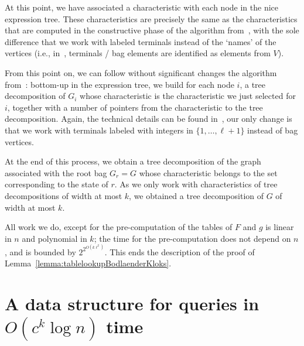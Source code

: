 \documentclass[a4paper,11pt]{article}
\theoremstyle{definition}
\theoremstyle{remark}
\begin{document}
At this point, we have associated a characteristic with each node in
the nice expression tree.  These characteristics are precisely the
same as the characteristics that are computed in the constructive
phase of the algorithm from~\cite[Section 6]{BodlaenderK96}, with the
sole difference that we work with labeled terminals instead of the
`names' of the vertices (i.e., in~\cite{BodlaenderK96}, terminals /
bag elements are identified as elements from $V$).

From this point on, we can follow without significant changes the
algorithm from~\cite[Section 6]{BodlaenderK96}: bottom-up in the
expression tree, we build for each node $i$, a tree decomposition of
$G_i$ whose characteristic is the characteristic we just selected for
$i$, together with a number of pointers from the characteristic to the
tree decomposition.  Again, the technical details can be found
in~\cite{BodlaenderK96}, our only change is that we work with
terminals labeled with integers in $\{1, \ldots, \ell+1\}$ instead of
bag vertices.

At the end of this process, we obtain a tree decomposition of the
graph associated with the root bag $G_r = G$ whose characteristic
belongs to the set corresponding to the state of $r$.  As we only work
with characteristics of tree decompositions of width at most $k$, we
obtained a tree decomposition of $G$ of width at most $k$.

All work we do, except for the pre-computation of the tables of $F$
and $g$ is linear in $n$ and polynomial in $k$; the time for the
pre-computation does not depend on $n$, and is bounded by $2^{2^{O(k
    \ell^2)}}$.  This ends the description of the proof of
Lemma~\ref{lemma:tablelookupBodlaenderKloks}.

\section{A data structure for queries in $O(c^k \log n)$ time}
\label{section:datastructure}
\end{document}
